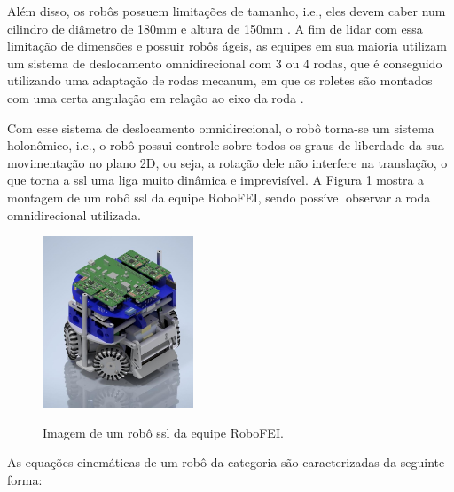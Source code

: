 \documentclass[acronym, symbols, table, deposito]{fei}
\begin{document}
		Além disso, os robôs possuem limitações de tamanho, i.e., eles devem caber num cilindro de diâmetro de 180mm e altura de 150mm \cite{rules}. A fim de lidar com essa limitação de dimensões e possuir robôs ágeis, as equipes em sua maioria utilizam um sistema de deslocamento omnidirecional com 3 ou 4 rodas, que é conseguido utilizando uma adaptação de rodas mecanum, em que os roletes são montados com uma certa angulação em relação ao eixo da roda \cite{aguiarreformulaccao}.
		
		Com esse sistema de deslocamento omnidirecional, o robô torna-se um sistema holonômico, i.e., o robô possui controle sobre todos os graus de liberdade da sua movimentação no plano 2D, ou seja, a rotação dele não interfere na translação, o que torna a \acrshort{ssl} uma liga muito dinâmica e imprevisível. A Figura \ref{fig:exemplo_robo_ssl} mostra a montagem de um robô \acrshort{ssl} da equipe RoboFEI, sendo possível observar a roda omnidirecional utilizada.
		
		\begin{figure}[!htb]
			\centering
			\caption{Imagem de um robô \acrshort{ssl} da equipe RoboFEI.} 
			\includegraphics[width=0.4\textwidth]{Foto_Robo_2012.jpg}
			\label{fig:exemplo_robo_ssl}
		\end{figure}
		
		As equações cinemáticas de um robô da categoria  são caracterizadas da seguinte forma:
		
\end{document}
